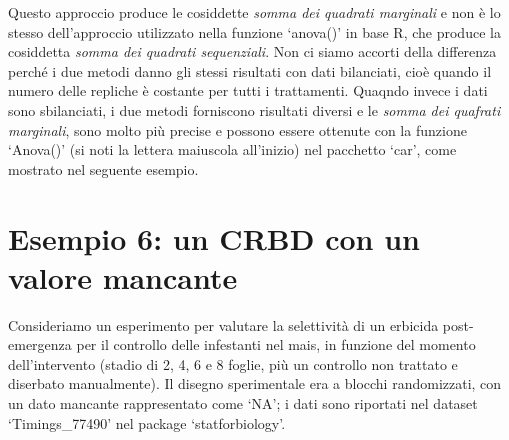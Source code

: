 \documentclass[
  12pt,
]{book}
\newenvironment{Shaded}{\begin{snugshade}}{\end{snugshade}}
\newcommand{\DocumentationTok}[1]{\textcolor[rgb]{0.56,0.35,0.01}{\textbf{\textit{#1}}}}
\newcommand{\FunctionTok}[1]{\textcolor[rgb]{0.00,0.00,0.00}{#1}}
\newcommand{\NormalTok}[1]{#1}
\newcommand{\OtherTok}[1]{\textcolor[rgb]{0.56,0.35,0.01}{#1}}
\newcommand{\SpecialCharTok}[1]{\textcolor[rgb]{0.00,0.00,0.00}{#1}}
\newcommand{\StringTok}[1]{\textcolor[rgb]{0.31,0.60,0.02}{#1}}
\begin{document}
Questo approccio produce le cosiddette \emph{somma dei quadrati marginali} e non è lo stesso dell'approccio utilizzato nella funzione `anova()' in base R, che produce la cosiddetta \emph{somma dei quadrati sequenziali}. Non ci siamo accorti della differenza perché i due metodi danno gli stessi risultati con dati bilanciati, cioè quando il numero delle repliche è costante per tutti i trattamenti. Quaqndo invece i dati sono sbilanciati, i due metodi forniscono risultati diversi e le \emph{somma dei quafrati marginali}, sono molto più precise e possono essere ottenute con la funzione `Anova()' (si noti la lettera maiuscola all'inizio) nel pacchetto `car', come mostrato nel seguente esempio.

\hypertarget{esempio-6-un-crbd-con-un-valore-mancante}{%
\section{Esempio 6: un CRBD con un valore mancante}\label{esempio-6-un-crbd-con-un-valore-mancante}}

Consideriamo un esperimento per valutare la selettività di un erbicida post-emergenza per il controllo delle infestanti nel mais, in funzione del momento dell'intervento (stadio di 2, 4, 6 e 8 foglie, più un controllo non trattato e diserbato manualmente). Il disegno sperimentale era a blocchi randomizzati, con un dato mancante rappresentato come `NA'; i dati sono riportati nel dataset `Timings\_77490' nel package `statforbiology'.

\begin{Shaded}
\end{Shaded}
\end{document}
